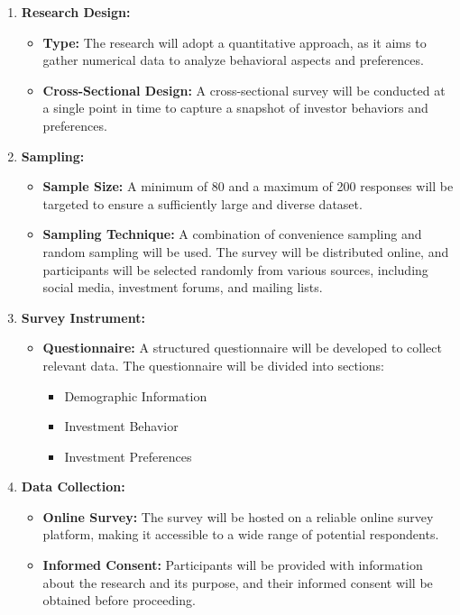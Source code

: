 \begin{enumerate}
    \item \textbf{Research Design:}
    \begin{itemize}
        \item \textbf{Type:} The research will adopt a quantitative approach, as it aims to gather numerical data to analyze behavioral aspects and preferences.
        \item \textbf{Cross-Sectional Design:} A cross-sectional survey will be conducted at a single point in time to capture a snapshot of investor behaviors and preferences.
    \end{itemize}

    \item \textbf{Sampling:}
    \begin{itemize}
        \item \textbf{Sample Size:} A minimum of 80 and a maximum of 200 responses will be targeted to ensure a sufficiently large and diverse dataset.
        \item \textbf{Sampling Technique:} A combination of convenience sampling and random sampling will be used. The survey will be distributed online, and participants will be selected randomly from various sources, including social media, investment forums, and mailing lists.
    \end{itemize}

    \item \textbf{Survey Instrument:}
    \begin{itemize}
        \item \textbf{Questionnaire:} A structured questionnaire will be developed to collect relevant data. The questionnaire will be divided into sections:
        \begin{itemize}
            \item Demographic Information
            \item Investment Behavior
            \item Investment Preferences
        \end{itemize}
    \end{itemize}

    \item \textbf{Data Collection:}
    \begin{itemize}
        \item \textbf{Online Survey:} The survey will be hosted on a reliable online survey platform, making it accessible to a wide range of potential respondents.
        \item \textbf{Informed Consent:} Participants will be provided with information about the research and its purpose, and their informed consent will be obtained before proceeding.
    \end{itemize}


\end{enumerate}
